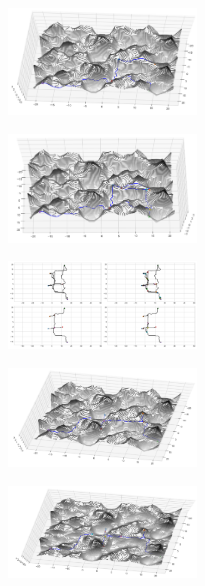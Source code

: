 \documentclass[french]{article}
\begin{document}
			\begin{figure}[H]
				\includegraphics[width=5cm]{Pics/g12.png}
			\end{figure}

			\begin{figure}[H]
				\includegraphics[width=5cm]{Pics/g13.png}
			\end{figure}

			\newpage

			\begin{figure}[H]
				\includegraphics[width=5cm]{Pics/g21.png}
			\end{figure}

			\begin{figure}[H]
				\includegraphics[width=5cm]{Pics/g22.png}
			\end{figure}

			\begin{figure}[H]
				\includegraphics[width=5cm]{Pics/g23.png}
			\end{figure}

			\newpage
\end{document}
